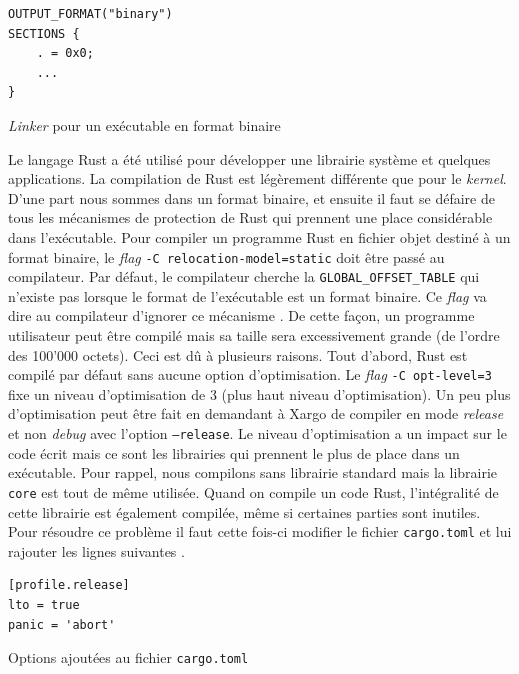 \begin{code}
\begin{verbatim}
OUTPUT_FORMAT("binary")
SECTIONS {
    . = 0x0;
    ...
}
\end{verbatim}
\caption{\textit{Linker} pour un exécutable en format binaire}
\label{lst:tasks:app:linker}
\end{code} \bigbreak

Le langage Rust a été utilisé pour développer une librairie système et quelques
applications. La compilation de Rust est légèrement différente que pour le
\textit{kernel}. D'une part nous sommes dans un format binaire, et ensuite
il faut se défaire de tous les mécanismes de protection de Rust qui prennent
une place considérable dans l'exécutable. Pour compiler un programme Rust
en fichier objet destiné à un format binaire, le \textit{flag}
\texttt{-C relocation-model=static} doit être passé au compilateur.
Par défaut, le compilateur cherche la \texttt{GLOBAL_OFFSET_TABLE}
qui n'existe pas lorsque le format de l'exécutable est un format binaire.
Ce \textit{flag} va dire au compilateur d'ignorer ce mécanisme \cite{ref25}.
De cette façon, un programme utilisateur peut être compilé mais sa taille sera
excessivement grande (de l'ordre des 100'000 octets). Ceci est dû à plusieurs
raisons. Tout d'abord, Rust est compilé par défaut sans aucune option d'optimisation.
Le \textit{flag} \texttt{-C opt-level=3} fixe un niveau d'optimisation
de 3 (plus haut niveau d'optimisation). Un peu plus d'optimisation peut être
fait en demandant à Xargo de compiler en mode \textit{release} et non \textit{debug}
avec l'option \texttt{--release}. Le niveau d'optimisation a un impact
sur le code écrit mais ce sont les librairies qui prennent le plus de place dans
un exécutable. Pour rappel, nous compilons sans librairie standard mais la librairie
\texttt{core} est tout de même utilisée. Quand on compile un code Rust,
l'intégralité de cette librairie est également compilée, même si certaines parties
sont inutiles. Pour résoudre ce problème il faut cette fois-ci modifier le fichier
\texttt{cargo.toml} et lui rajouter les lignes suivantes \cite{ref26}.

\begin{code}
\begin{verbatim}
[profile.release]
lto = true
panic = 'abort'
\end{verbatim}
\caption{Options ajoutées au fichier \texttt{cargo.toml}}
\label{lst:tasks:app:cargotoml}
\end{code} \bigbreak


